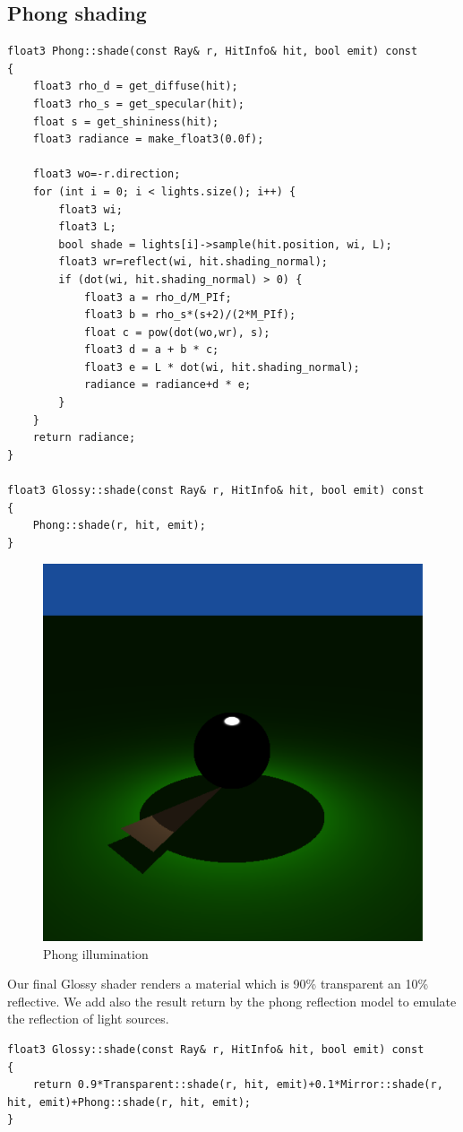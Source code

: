 \subsection{Phong shading}
\begin{lstlisting}
float3 Phong::shade(const Ray& r, HitInfo& hit, bool emit) const
{
	float3 rho_d = get_diffuse(hit);
	float3 rho_s = get_specular(hit);
	float s = get_shininess(hit);
	float3 radiance = make_float3(0.0f);
	
	float3 wo=-r.direction;
	for (int i = 0; i < lights.size(); i++) {
		float3 wi;
		float3 L;
		bool shade = lights[i]->sample(hit.position, wi, L);
		float3 wr=reflect(wi, hit.shading_normal);
		if (dot(wi, hit.shading_normal) > 0) {
			float3 a = rho_d/M_PIf;
			float3 b = rho_s*(s+2)/(2*M_PIf);
			float c = pow(dot(wo,wr), s);
			float3 d = a + b * c;
			float3 e = L * dot(wi, hit.shading_normal);
			radiance = radiance+d * e;
		}
	}
	return radiance;
}

float3 Glossy::shade(const Ray& r, HitInfo& hit, bool emit) const
{
	Phong::shade(r, hit, emit);
}
\end{lstlisting}

\begin{figure}[H]
	\centering
	\includegraphics[scale=\imagescale]{images/worksheet_2/part_4}
	\caption{Phong illumination}
	\label{fig:phong_reflections}
\end{figure}
Our final Glossy shader renders a material which is 90\% transparent an 10\% reflective. We add also the result return by the phong reflection model to emulate the reflection of light sources.
\begin{lstlisting}
float3 Glossy::shade(const Ray& r, HitInfo& hit, bool emit) const
{
	return 0.9*Transparent::shade(r, hit, emit)+0.1*Mirror::shade(r, hit, emit)+Phong::shade(r, hit, emit);
}
\end{lstlisting}

